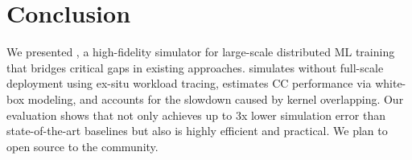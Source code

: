 
\section{Conclusion}
We presented \sys, a high-fidelity simulator for large-scale distributed ML training that bridges critical gaps in existing approaches. 
\sys simulates without full-scale deployment using ex-situ workload tracing, estimates CC performance via white-box modeling, and accounts for the slowdown caused by kernel overlapping.
Our evaluation shows that \sys not only achieves up to 3x lower simulation error than state-of-the-art baselines but also is highly efficient and practical.
We plan to open source \sys to the community.  
